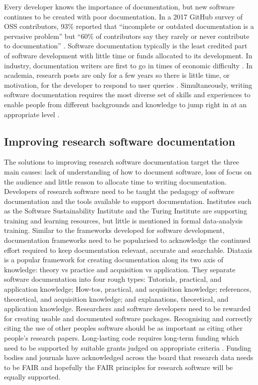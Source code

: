 \documentclass[../main.tex]{subfiles}
\begin{document}
Every developer knows the importance of documentation, but new software continues to be created with poor documentation.
In a 2017 GitHub survey of OSS contributors, 93\% reported that “incomplete or outdated documentation is a pervasive problem” but “60\% of contributors say they rarely or never contribute to documentation” \parencite{Geiger2017}.
Software documentation typically is the least credited part of software development with little time or funds allocated to its development.
In industry, documentation writers are first to go in times of economic difficulty \parencite{Forward2002}.
In academia, research posts are only for a few years so there is little time, or motivation, for the developer to respond to user queries \parencite{Hermann2022}.
Simultaneously, writing software documentation requires the most diverse set of skills and experiences to enable people from different backgrounds and knowledge to jump right in at an appropriate level \parencite{Geiger2018}.


\subsection{Improving research software documentation}

The solutions to improving research software documentation target the three main causes: lack of understanding of how to document software, loss of focus on the audience and little reason to allocate time to writing documentation. 
Developers of research software need to be taught the pedagogy of software documentation and the tools available to support documentation.
Institutes such as the Software Sustainability Institute and the Turing Institute are supporting training and learning resources, but little is mentioned in formal data-analysis training. 
Similar to the frameworks developed for software development, documentation frameworks need to be popularised to acknowledge the continued effort required to keep documentation relevant, accurate and searchable.
Diataxis is a popular framework for creating documentation along its two axis of knowledge: theory vs practice and acquisition vs application. 
They separate software documentation into four rough types: Tutorials, practical, and application knowledge; How-tos, practical, and acquisition knowledge; references, theoretical, and acquisition knowledge; and explanations, theoretical, and application knowledge.
Researchers and software developers need to be rewarded for creating usable and documented software packages.
Recognising and correctly citing the use of other peoples software should be as important as citing other people's research papers.
Long-lasting code requires long-term funding which need to be supported by suitable grants judged on appropriate criteria \parencite{Goble2014}.
Funding bodies and journals have acknowledged across the board that research data needs to be FAIR and hopefully the FAIR principles for research software will be equally supported.
\newpage
\end{document}
